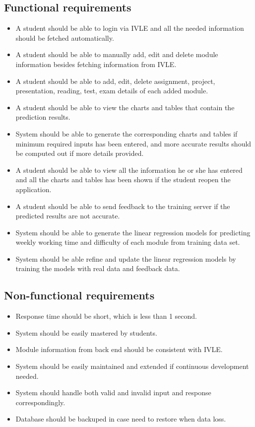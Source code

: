 \documentclass[fyp]{socreport}
\begin{document}
\subsection{Functional requirements}
\begin{itemize}
	\item A student should be able to login via IVLE and all the needed information should be fetched automatically.
	\item A student should be able to manually add, edit and delete module information besides fetching information from IVLE.
	\item A student should be able to add, edit, delete assignment, project, presentation, reading, test, exam details of each added module.
	\item A student should be able to view the charts and tables that contain the prediction results.
	\item System should be able to generate the corresponding charts and tables if minimum required inputs has been entered, and more accurate results should be computed out if more details provided.
	\item A student should be able to view all the information he or she has entered and all the charts and tables has been shown if the student reopen the application.
	\item A student should be able to send feedback to the training server if the predicted results are not accurate.
	\item System should be able to generate the linear regression models for predicting weekly working time and difficulty of each module from training data set.
	\item System should be able refine and update the linear regression models by training the models with real data and feedback data.
\end{itemize}

\subsection{Non-functional requirements}
\begin{itemize}
	\item Response time should be short, which is less than 1 second.
	\item System should be easily mastered by students.
	\item Module information from back end should be consistent with IVLE.
	\item System should be easily maintained and extended if continuous development needed.
	\item System should handle both valid and invalid input and response correspondingly.
	\item Database should be backuped in case need to restore when data loss.
\end{itemize}
\end{document}
